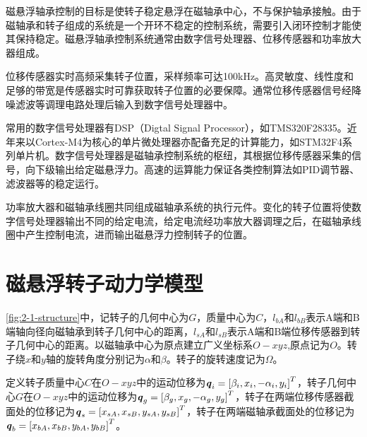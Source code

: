 磁悬浮轴承控制的目标是使转子稳定悬浮在磁轴承中心，不与保护轴承接触。由于磁轴承和转子组成的系统是一个开环不稳定的控制系统，需要引入闭环控制才能使其保持稳定。磁悬浮轴承控制系统通常由数字信号处理器、位移传感器和功率放大器组成。

位移传感器实时高频采集转子位置，采样频率可达100kHz。高灵敏度、线性度和足够的带宽是传感器实时可靠获取转子位置的必要保障。通常位移传感器信号经降噪滤波等调理电路处理后输入到数字信号处理器中。

常用的数字信号处理器有DSP（Digtal Signal Processor），如TMS320F28335。近年来以Cortex-M4为核心的单片微处理器亦配备充足的计算能力，如STM32F4系列单片机。数字信号处理器是磁轴承控制系统的枢纽，其根据位移传感器采集的信号，向下级输出给定磁悬浮力。高速的运算能力保证各类控制算法如PID调节器、滤波器等的稳定运行。

功率放大器和磁轴承线圈共同组成磁轴承系统的执行元件。变化的转子位置将使数字信号处理器输出不同的给定电流，给定电流经功率放大器调理之后，在磁轴承线圈中产生控制电流，进而输出磁悬浮力控制转子的位置。

\section{磁悬浮转子动力学模型}
\autoref{fig:2-1-structure}中，记转子的几何中心为$ G $，质量中心为$ C $，$ l_{bA} $和$ l_{bB} $表示A端和B端轴向径向磁轴承到转子几何中心的距离，$ l_{sA} $和$ l_{sB} $表示A端和B端位移传感器到转子几何中心的距离。以磁轴承中心为原点建立广义坐标系$ O-xyz $,原点记为$ O $。转子绕$ x $和$ y $轴的旋转角度分别记为$ \alpha $和$ \beta $。转子的旋转速度记为$ \Omega $。

定义转子质量中心$ C $在$ O-xyz $中的运动位移为${\textbf{\textit{q}}_i} = {\left[ {{\beta _i},{x_i}, - {\alpha _i},{y_i}} \right]^T}$，转子几何中心$ G $在$ O-xyz $中的运动位移为${\textbf{\textit{q}}_g} = {\left[ {{\beta _g},{x_g}, - {\alpha _g},{y_g}} \right]^T}$，转子在两端位移传感器截面处的位移记为${\textbf{\textit{q}}_s} = {\left[ {{x_{sA}},{x_{sB}},{y_{sA}},{y_{sB}}} \right]^T}$，转子在两端磁轴承截面处的位移记为${\textbf{\textit{q}}_b} = {\left[ {{x_{bA}},{x_{bB}},{y_{bA}},{y_{bB}}} \right]^T}$。

